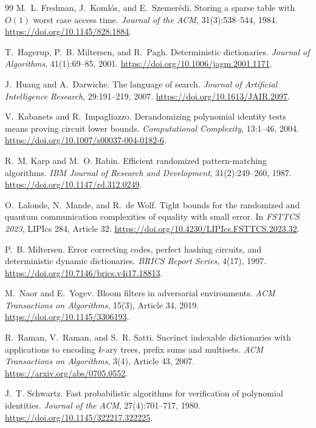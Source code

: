 \documentclass[11pt]{article}
\begin{document}
\begin{thebibliography}{99}
M.~L. Fredman, J.~Koml\'os, and E.~Szemer\'edi.
\newblock Storing a sparse table with $O(1)$ worst case access time.
\newblock \emph{Journal of the ACM}, 31(3):538--544, 1984.
\newblock \url{https://doi.org/10.1145/828.1884}.

T.~Hagerup, P.~B. Miltersen, and R.~Pagh.
\newblock Deterministic dictionaries.
\newblock \emph{Journal of Algorithms}, 41(1):69--85, 2001.
\newblock \url{https://doi.org/10.1006/jagm.2001.1171}.

J.~Huang and A.~Darwiche.
\newblock The language of search.
\newblock \emph{Journal of Artificial Intelligence Research}, 29:191--219,
2007.
\newblock \url{https://doi.org/10.1613/JAIR.2097}.

V.~Kabanets and R.~Impagliazzo.
\newblock Derandomizing polynomial identity tests means proving circuit lower
bounds.
\newblock \emph{Computational Complexity}, 13:1--46, 2004.
\newblock \url{https://doi.org/10.1007/s00037-004-0182-6}.

R.~M. Karp and M.~O. Rabin.
\newblock Efficient randomized pattern-matching algorithms.
\newblock \emph{IBM Journal of Research and Development}, 31(2):249--260,
1987.
\newblock \url{https://doi.org/10.1147/rd.312.0249}.

O.~Lalonde, N.~Mande, and R.~de Wolf.
\newblock Tight bounds for the randomized and quantum communication
complexities of equality with small error.
\newblock In \emph{FSTTCS 2023}, LIPIcs 284, Article 32.
\newblock \url{https://doi.org/10.4230/LIPIcs.FSTTCS.2023.32}.

P.~B. Miltersen.
\newblock Error correcting codes, perfect hashing circuits, and deterministic
dynamic dictionaries.
\newblock \emph{BRICS Report Series}, 4(17), 1997.
\newblock \url{https://doi.org/10.7146/brics.v4i17.18813}.

M.~Naor and E.~Yogev.
\newblock Bloom filters in adversarial environments.
\newblock \emph{ACM Transactions on Algorithms}, 15(3), Article 34, 2019.
\newblock \url{https://doi.org/10.1145/3306193}.

R.~Raman, V.~Raman, and S.~R. Satti.
\newblock Succinct indexable dictionaries with applications to encoding
$k$-ary trees, prefix sums and multisets.
\newblock \emph{ACM Transactions on Algorithms}, 3(4), Article 43, 2007.
\newblock \url{https://arxiv.org/abs/0705.0552}.

J.~T. Schwartz.
\newblock Fast probabilistic algorithms for verification of polynomial
identities.
\newblock \emph{Journal of the ACM}, 27(4):701--717, 1980.
\newblock \url{https://doi.org/10.1145/322217.322225}.

\end{thebibliography}
\end{document}
